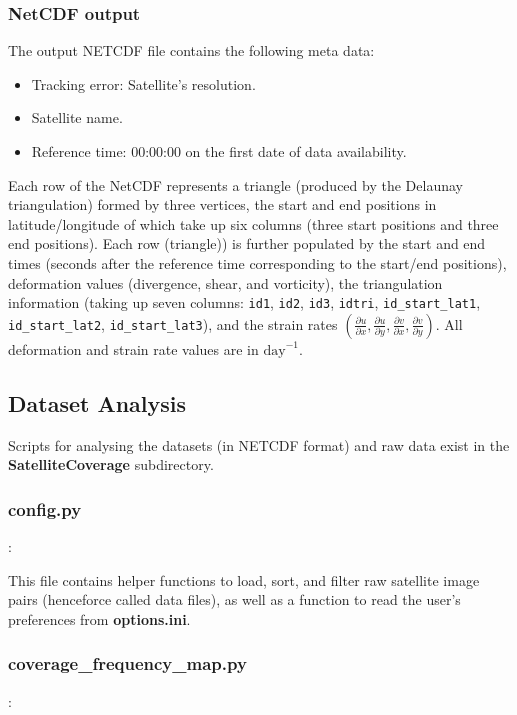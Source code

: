 \documentclass{article}
\newcommand{\ode}[2]{\frac{\partial #1}{\partial #2}}
\begin{document}
        \subsubsection{NetCDF output}

            The output NETCDF file contains the following meta data:
            \begin{itemize}
                \item Tracking error: Satellite's resolution.
                \item Satellite name.
                \item Reference time: 00:00:00 on the first date of data availability.
            \end{itemize}
            Each row of the NetCDF represents a triangle (produced by the Delaunay triangulation) formed by three vertices, the start and end positions in latitude/longitude of which take up six columns (three start positions and three end positions). Each row (triangle)) is further populated by the start and end times (seconds after the reference time corresponding to the start/end positions), deformation values (divergence, shear, and vorticity), the triangulation information (taking up seven columns: \verb?id1?, \verb?id2?, \verb?id3?, \verb?idtri?, \verb?id_start_lat1?, \verb?id_start_lat2?, \verb?id_start_lat3?), and the strain rates $\left(\ode{u}{x},\ode{u}{y},\ode{v}{x},\ode{v}{y}\right)$. All deformation and strain rate values are in $\mathrm{day}^{-1}$.

    \subsection{Dataset Analysis}
    \label{dataset_analysis}

        Scripts for analysing the datasets (in NETCDF format) and raw data exist in the \textbf{SatelliteCoverage} subdirectory.

        \subsubsection{\textbf{config.py}}:

            This file contains helper functions to load, sort, and filter raw satellite image pairs (henceforce called data files), as well as a function to read the user's preferences from \textbf{options.ini}.

        \subsubsection{\textbf{coverage\_frequency\_map.py}}:
\end{document}
